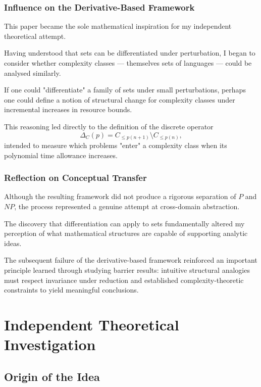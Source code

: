 \documentclass[12pt]{article}
\begin{document}
\subsubsection*{Influence on the Derivative-Based Framework}

This paper became the sole mathematical inspiration for my independent theoretical attempt.

Having understood that sets can be differentiated under perturbation, I began to consider whether complexity classes --- themselves sets of languages --- could be analysed similarly.

If one could "differentiate" a family of sets under small perturbations, perhaps one could define a notion of structural change for complexity classes under incremental increases in resource bounds.

This reasoning led directly to the definition of the discrete operator
\[
\Delta_C(p) = C_{\le p(n+1)} \setminus C_{\le p(n)},
\]
intended to measure which problems "enter" a complexity class when its polynomial time allowance increases.

\subsubsection*{Reflection on Conceptual Transfer}

Although the resulting framework did not produce a rigorous separation of $P$ and $NP$, the process represented a genuine attempt at cross-domain abstraction.

The discovery that differentiation can apply to sets fundamentally altered my perception of what mathematical structures are capable of supporting analytic ideas.

The subsequent failure of the derivative-based framework reinforced an important principle learned through studying barrier results: intuitive structural analogies must respect invariance under reduction and established complexity-theoretic constraints to yield meaningful conclusions.

\section{Independent Theoretical Investigation}

\subsection{Origin of the Idea}
\end{document}
